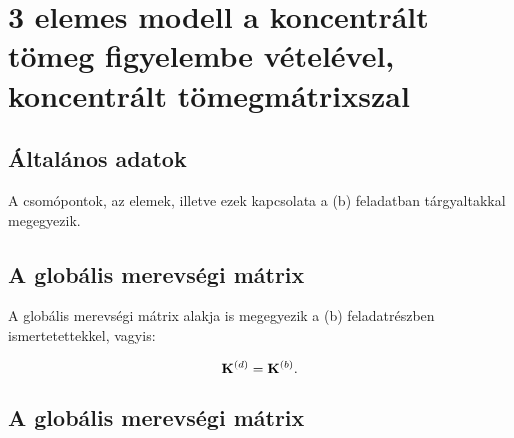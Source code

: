 \section{3 elemes modell a koncentrált tömeg figyelembe vételével, koncentrált tömegmátrixszal}

\subsection{Általános adatok}

A csomópontok, az elemek, illetve ezek kapcsolata a (b) feladatban
tárgyaltakkal megegyezik.

\subsection{A globális merevségi mátrix}

A globális merevségi mátrix alakja is megegyezik a (b) feladatrészben
ismertetettekkel, vagyis:
\begin{myframe}
  \begin{equation}
    \mathbf{K}^{(d)} = \mathbf{K}^{(b)}
    \text.
  \end{equation}
\end{myframe}

\subsection{A globális merevségi mátrix}

